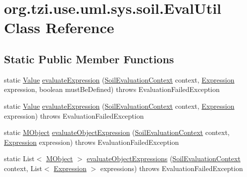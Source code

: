 \hypertarget{classorg_1_1tzi_1_1use_1_1uml_1_1sys_1_1soil_1_1_eval_util}{\section{org.\-tzi.\-use.\-uml.\-sys.\-soil.\-Eval\-Util Class Reference}
\label{classorg_1_1tzi_1_1use_1_1uml_1_1sys_1_1soil_1_1_eval_util}
}
\subsection*{Static Public Member Functions}
\begin{DoxyCompactItemize}
\item 
static \hyperlink{classorg_1_1tzi_1_1use_1_1uml_1_1ocl_1_1value_1_1_value}{Value} \hyperlink{classorg_1_1tzi_1_1use_1_1uml_1_1sys_1_1soil_1_1_eval_util_ad87a79a7bee82ae5b662a639cbb5b759}{evaluate\-Expression} (\hyperlink{classorg_1_1tzi_1_1use_1_1uml_1_1sys_1_1soil_1_1_soil_evaluation_context}{Soil\-Evaluation\-Context} context, \hyperlink{classorg_1_1tzi_1_1use_1_1uml_1_1ocl_1_1expr_1_1_expression}{Expression} expression, boolean must\-Be\-Defined)  throws Evaluation\-Failed\-Exception 
\item 
static \hyperlink{classorg_1_1tzi_1_1use_1_1uml_1_1ocl_1_1value_1_1_value}{Value} \hyperlink{classorg_1_1tzi_1_1use_1_1uml_1_1sys_1_1soil_1_1_eval_util_af42a278a8d0a1e8c48f23c63c54e7332}{evaluate\-Expression} (\hyperlink{classorg_1_1tzi_1_1use_1_1uml_1_1sys_1_1soil_1_1_soil_evaluation_context}{Soil\-Evaluation\-Context} context, \hyperlink{classorg_1_1tzi_1_1use_1_1uml_1_1ocl_1_1expr_1_1_expression}{Expression} expression)  throws Evaluation\-Failed\-Exception 
\item 
static \hyperlink{interfaceorg_1_1tzi_1_1use_1_1uml_1_1sys_1_1_m_object}{M\-Object} \hyperlink{classorg_1_1tzi_1_1use_1_1uml_1_1sys_1_1soil_1_1_eval_util_a2a0069fb989d0f58d02e6d1894dbdc0b}{evaluate\-Object\-Expression} (\hyperlink{classorg_1_1tzi_1_1use_1_1uml_1_1sys_1_1soil_1_1_soil_evaluation_context}{Soil\-Evaluation\-Context} context, \hyperlink{classorg_1_1tzi_1_1use_1_1uml_1_1ocl_1_1expr_1_1_expression}{Expression} expression)  throws Evaluation\-Failed\-Exception 
\item 
static List$<$ \hyperlink{interfaceorg_1_1tzi_1_1use_1_1uml_1_1sys_1_1_m_object}{M\-Object} $>$ \hyperlink{classorg_1_1tzi_1_1use_1_1uml_1_1sys_1_1soil_1_1_eval_util_a36739e6b675986ddeb271d38a5fa24bd}{evaluate\-Object\-Expressions} (\hyperlink{classorg_1_1tzi_1_1use_1_1uml_1_1sys_1_1soil_1_1_soil_evaluation_context}{Soil\-Evaluation\-Context} context, List$<$ \hyperlink{classorg_1_1tzi_1_1use_1_1uml_1_1ocl_1_1expr_1_1_expression}{Expression} $>$ expressions)  throws Evaluation\-Failed\-Exception 

\end{DoxyCompactItemize}
